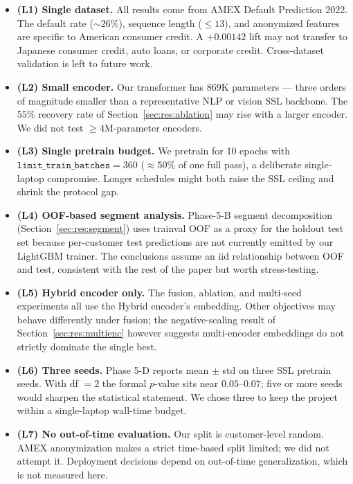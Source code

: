 \documentclass[sigconf, anonymous, review]{acmart}
\begin{document}
\begin{itemize}
  \item \textbf{(L1) Single dataset.} All results come from AMEX
        Default Prediction 2022. The default rate ($\sim 26\%$),
        sequence length ($\leq 13$), and anonymized features are
        specific to American consumer credit. A $+0.00142$ lift may
        not transfer to Japanese consumer credit, auto loans, or
        corporate credit. Cross-dataset validation is left to
        future work.
  \item \textbf{(L2) Small encoder.} Our transformer has
        $869$K parameters --- three orders of magnitude smaller than
        a representative NLP or vision SSL backbone. The $55\%$
        recovery rate of Section~\ref{sec:res:ablation} may rise
        with a larger encoder. We did not test $\geq 4$M-parameter
        encoders.
  \item \textbf{(L3) Single pretrain budget.} We pretrain for 10
        epochs with $\texttt{limit\_train\_batches} = 360$
        ($\approx 50\%$ of one full pass), a deliberate single-laptop
        compromise. Longer schedules might both raise the SSL ceiling
        and shrink the protocol gap.
  \item \textbf{(L4) OOF-based segment analysis.} Phase-5-B segment
        decomposition (Section~\ref{sec:res:segment}) uses
        trainval OOF as a proxy for the holdout test set because
        per-customer test predictions are not currently emitted by
        our LightGBM trainer. The conclusions assume an iid
        relationship between OOF and test, consistent with the rest
        of the paper but worth stress-testing.
  \item \textbf{(L5) Hybrid encoder only.} The fusion, ablation,
        and multi-seed experiments all use the Hybrid encoder's
        embedding. Other objectives may behave differently under
        fusion; the negative-scaling result of
        Section~\ref{sec:res:multienc} however suggests multi-encoder
        embeddings do not strictly dominate the single best.
  \item \textbf{(L6) Three seeds.} Phase 5-D reports mean $\pm$ std
        on three SSL pretrain seeds. With df $= 2$ the formal
        $p$-value sits near $0.05$--$0.07$; five or more seeds would
        sharpen the statistical statement. We chose three to keep
        the project within a single-laptop wall-time budget.
  \item \textbf{(L7) No out-of-time evaluation.} Our split is
        customer-level random. AMEX anonymization makes a strict
        time-based split limited; we did not attempt it. Deployment
        decisions depend on out-of-time generalization, which is
        not measured here.
\end{itemize}
\end{document}
